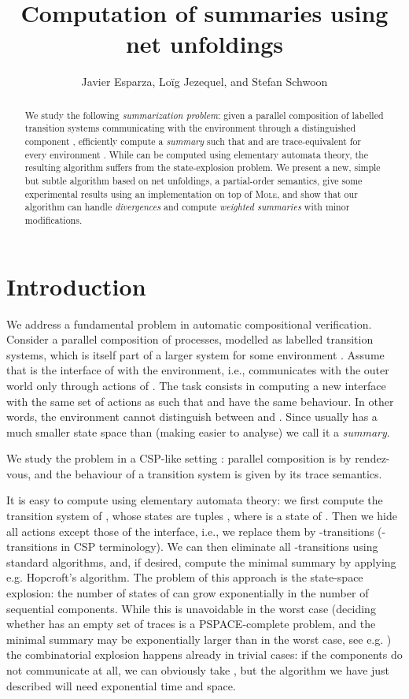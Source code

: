 \documentclass{llncs}
\title{Computation of summaries using net unfoldings}
\author{Javier Esparza\inst{1}, Lo\"ig Jezequel\inst{2}, and Stefan Schwoon\inst{3}}
\institute{Institut f\"ur Informatik, Technische Universit\"at M\"unchen, Germany
\and
ENS Cachan Bretagne, Rennes, France
\and
LSV, ENS Cachan \& CNRS, INRIA Saclay, France}
\begin{document}
\maketitle

\begin{abstract}
We study the following {\em summarization problem}: given a parallel
composition  of labelled transition systems
communicating with the environment through a distinguished component , 
efficiently compute a {\em summary }  such that  and  are trace-equivalent for every environment . While  
can be computed using elementary automata theory, the resulting algorithm suffers from
the state-explosion problem. We present a new, simple but subtle algorithm based on net unfoldings, 
a partial-order semantics, give some experimental results using an implementation on top of \textsc{Mole}, and show that our algorithm can handle {\em divergences} and compute {\em weighted summaries} with minor modifications.


\end{abstract}

\section{Introduction}

We address a fundamental problem in automatic compositional verification. Consider a 
parallel composition  of processes,
modelled as labelled transition systems, which is itself part of a larger system  for some environment .
Assume that  is the interface of  with the environment, i.e., 
 communicates with the outer world only through actions 
of . The task consists in computing a new interface 
 with the same set
of actions as  such that  and  
have the same behaviour. In other words, the environment  cannot distinguish between 
 and . Since
 usually has a much smaller state space than  (making
 easier to analyse) we call it a {\em summary}.

We study the problem in a CSP-like setting \cite{Hoare85}:
parallel composition is by rendez-vous, and the behaviour of a transition
system is given by its trace semantics. 

It is easy to compute  using elementary automata theory:
we first compute the transition system of , whose states  
are tuples , where  is a state of . Then we
hide all actions except those of the interface, i.e., we 
replace them by -transitions (-transitions in CSP terminology). 
We can then eliminate all -transitions using standard algorithms, and, if
desired, compute the minimal summary by applying e.g. Hopcroft's algorithm.
The problem of this approach is the state-space explosion: the number of states of 
 can grow exponentially in the number of sequential components. While this
is unavoidable in the worst case (deciding whether  has an empty set of traces 
is a PSPACE-complete problem, and the minimal summary  may be exponentially larger than 
 in the worst case, see e.g. \cite{HarelKV97}) the combinatorial explosion happens 
already in trivial cases: if the components  do not communicate at all, 
we can obviously take , but the algorithm we have just 
described will need 
exponential time and space.
\end{document}
